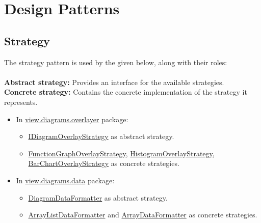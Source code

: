 \documentclass[10pt,a4paper]{report}
\newcommand{\refer}[2]{\hyperref[#1]{\textcolor{col:reference}{#2}}}
\newcommand{\packagebeginning}{edu.kit.informatik.pse.gelf} %
\newcommand{\lblroot}{lbl} %
\newcommand{\lblpackage}{} %
\newcommand{\lblpackageelement}{} %
\newcommand{\lblpackageelementmember}{} %
\newcommand{\lblpackageelementmemberparameter}{} %
\newcommand{\casclabelname}{\lblroot\lblpackage\lblpackageelement\lblpackageelementmember\lblpackageelementmemberparameter}
\newcommand{\casclabel}{\label{\casclabelname}}
\newcommand{\patternentry}[2]{
    #1{#2}
}
\newcommand{\pattern}[2]{
    \patternentry{\section}{#1}
    {#2}
}
\begin{document}
\chapter{Design Patterns}
\pattern{Strategy}{
    The strategy pattern is used by the given below, along with their roles:
    \leavevmode \\ \leavevmode \\
    \textbf{Abstract strategy:} Provides an interface for the available strategies. \leavevmode \\
    \textbf{Concrete strategy:} Contains the concrete implementation of the strategy it represents. \leavevmode \\
    \begin{itemize}
        \item In \refer{\lblroot:view.diagrams.overlayer}{view.diagrams.overlayer} package:
        \begin{itemize}
            \item \refer{\lblroot:view.diagrams.overlayer:IDiagramOverlayStrategy}{IDiagramOverlayStrategy} as abstract strategy.
            \item \refer{\lblroot:view.diagrams.overlayer:FunctionGraphOverlayStrategy}{FunctionGraphOverlayStrategy}, \refer{\lblroot:view.diagrams.overlayer:HistogramOverlayStrategy}{HistogramOverlayStrategy}, \refer{\lblroot:view.diagrams.overlayer:BarChartOverlayStrategy}{BarChartOverlayStrategy} as concrete strategies.
        \end{itemize}
        \item In \refer{\lblroot:view.diagrams.data}{view.diagrams.data} package:
        \begin{itemize}
            \item \refer{\lblroot:view.diagrams.data:DiagramDataFormatter}{DiagramDataFormatter} as abstract strategy.
            \item \refer{\lblroot:view.diagrams.data:ArrayListDataFormatter}{ArrayListDataFormatter} and \refer{\lblroot:view.diagrams.data:ArrayDataFormatter}{ArrayDataFormatter} as concrete strategies.
        \end{itemize}
    \end{itemize}
}
\end{document}
